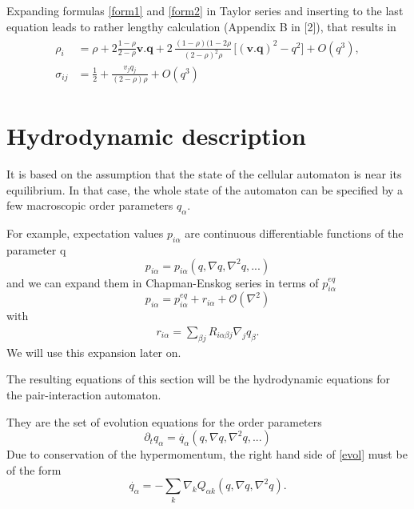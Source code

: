 Expanding formulas \ref{form1} and \ref{form2} in Taylor series and inserting to the last equation leads to rather lengthy calculation (Appendix B in [2]), that results in 
\begin{align}
\begin{split}
\rho_i &= \rho + 2 \frac{1-\rho}{2-\rho} \bm{v}.\bm{q} + 2 \, \frac{(1-\rho)(1-2\rho}{(2-\rho)^2 \rho} \, \big[(\bm{v}.\bm{q})^2 - q^2 \big] + O(q^3), \\
\sigma_{ij} &= \frac{1}{2} + \frac{v_j q_j}{(2-\rho)\rho} + O(q^3)
\end{split}
\end{align}

\section{Hydrodynamic description}
It is based on the assumption that the state of the cellular automaton is near its equilibrium.
In that case, the whole state of the automaton can be specified by a few macroscopic order parameters $q_{\alpha}$.

\bigskip

For example, expectation values $p_{i\alpha}$ are continuous differentiable functions of the parameter q
\begin{equation}
p_{i\alpha} = p_{i\alpha}(q, \nabla q, \nabla^2 q,...)
\end{equation}
and we can expand them in Chapman-Enskog series in terms of $p_{i\alpha}^{eq}$
\begin{equation} \label{expro}
p_{i\alpha} = p_{i\alpha}^{eq} + r_{i\alpha} + \mathcal{O}(\nabla^2)
\end{equation}
with
\begin{align}
r_{i\alpha} = \sum_{\beta j} R_{i\alpha \beta j } \nabla_j q_{\beta}.
\end{align}
We will use this expansion later on.

\bigskip

The resulting equations of this section will be the hydrodynamic equations for the pair-interaction automaton.

They are the set of evolution equations for the order parameters
\begin{equation} \label{evol}
\partial_t q_{\alpha} = \dot{q_{\alpha}}(q,\nabla q, \nabla^2 q,...)
\end{equation}
Due to conservation of the hypermomentum, the right hand side of \ref{evol} must be of the form
\begin{equation}
\dot{q_{\alpha}} = -\sum_k \nabla_k Q_{\alpha k}(q, \nabla q, \nabla^2 q).
\end{equation}

